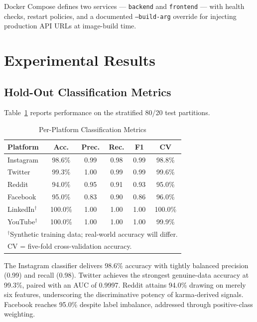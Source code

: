 \documentclass[conference]{IEEEtran}
\begin{document}
Docker Compose defines two services --- \texttt{backend} and \texttt{frontend} --- with health checks, restart policies, and a documented \texttt{--build-arg} override for injecting production API URLs at image-build time.

\section{Experimental Results}

\subsection{Hold-Out Classification Metrics}

Table~\ref{tab:results} reports performance on the stratified 80/20 test partitions.

\begin{table}[htbp]
\caption{Per-Platform Classification Metrics}
\label{tab:results}
\centering
\begin{tabular}{lccccc}
\toprule
\textbf{Platform} & \textbf{Acc.} & \textbf{Prec.} & \textbf{Rec.} & \textbf{F1} & \textbf{CV} \\
\midrule
Instagram & 98.6\% & 0.99 & 0.98 & 0.99 & 98.8\% \\
Twitter & 99.3\% & 1.00 & 0.99 & 0.99 & 99.6\% \\
Reddit & 94.0\% & 0.95 & 0.91 & 0.93 & 95.0\% \\
Facebook & 95.0\% & 0.83 & 0.90 & 0.86 & 96.0\% \\
LinkedIn$^\dagger$ & 100.0\% & 1.00 & 1.00 & 1.00 & 100.0\% \\
YouTube$^\dagger$ & 100.0\% & 1.00 & 1.00 & 1.00 & 99.9\% \\
\bottomrule
\multicolumn{6}{l}{\footnotesize $^\dagger$Synthetic training data; real-world accuracy will differ.} \\
\multicolumn{6}{l}{\footnotesize CV = five-fold cross-validation accuracy.}
\end{tabular}
\end{table}

The Instagram classifier delivers 98.6\% accuracy with tightly balanced precision (0.99) and recall (0.98). Twitter achieves the strongest genuine-data accuracy at 99.3\%, paired with an AUC of 0.9997. Reddit attains 94.0\% drawing on merely six features, underscoring the discriminative potency of karma-derived signals. Facebook reaches 95.0\% despite label imbalance, addressed through positive-class weighting.
\end{document}
